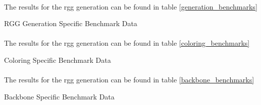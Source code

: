 \documentclass{article}
\begin{document}
  \paragraph{}
  The results for the rgg generation can be found in table \ref{generation_benchmarks}
  \begin{table}
    \centering
    \label{generation_benchmarks}
    \begin{adjustbox}{width=1\textwidth}
    \end{adjustbox}
	  \caption{RGG Generation Specific Benchmark Data}
  \end{table}

  \paragraph{}
  The results for the rgg generation can be found in table \ref{coloring_benchmarks}
  \begin{table}
    \centering
    \label{coloring_benchmarks}
    \begin{adjustbox}{width=1\textwidth}
    \end{adjustbox}
	  \caption{Coloring Specific Benchmark Data}
  \end{table}

  \paragraph{}
  The results for the rgg generation can be found in table \ref{backbone_benchmarks}
  \begin{table}
    \centering
    \label{backbone_benchmarks}
    \begin{adjustbox}{width=1\textwidth}
    \end{adjustbox}
	  \caption{Backbone Specific Benchmark Data}
  \end{table}

\printbibliography
\end{document}
